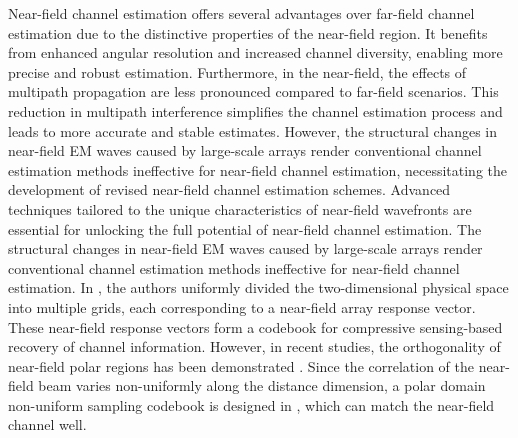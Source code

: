 \documentclass[10pt,journal,twocolumn,twoside]{IEEEtran} %
\begin{document}
 Near-field channel estimation offers several advantages over far-field channel estimation due to the distinctive properties of the near-field region. It benefits from enhanced angular resolution and increased channel diversity, enabling more precise and robust estimation. Furthermore, in the near-field, the effects of multipath propagation are less pronounced compared to far-field scenarios. This reduction in multipath interference simplifies the channel estimation process and leads to more accurate and stable estimates. However, the structural changes in near-field EM waves caused by large-scale arrays render conventional channel estimation methods ineffective for near-field channel estimation, necessitating the development of revised near-field channel estimation schemes. Advanced techniques tailored to the unique characteristics of near-field wavefronts are essential for unlocking the full potential of near-field channel estimation. 
The structural changes in near-field EM waves caused by large-scale arrays render conventional channel estimation methods ineffective for near-field channel estimation. 
In \cite{8949454}, the authors uniformly divided the two-dimensional physical space into multiple grids, each corresponding to a near-field array response vector. These near-field response vectors form a codebook for compressive sensing-based recovery of channel information. However, in recent studies, the orthogonality of near-field polar regions has been demonstrated \cite{9693928}. Since the correlation of the near-field beam varies non-uniformly along the distance dimension, a polar domain non-uniform sampling codebook is designed in \cite{9693928}, which can match the near-field channel well.
\end{document}
